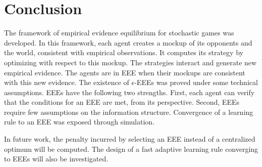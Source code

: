 \section{Conclusion}

The framework of empirical evidence equilibrium for stochastic games was developed.
In this framework, each agent creates a mockup of its opponents and the world, consistent with empirical observations.
It computes its strategy by optimizing with respect to this mockup.
The strategies interact and generate new empirical evidence.
The agents are in EEE when their mockups are consistent with this new evidence.
The existence of \(\epsilon\)-EEEs was proved under some technical assumptions.
EEEs have the following two strengths.
First, each agent can verify that the conditions for an EEE are met, from its perspective.
Second, EEEs require few assumptions on the information structure.
Convergence of a learning rule to an EEE was exposed through simulation.

In future work, the penalty incurred by selecting an EEE instead of a centralized optimum will be computed.
The design of a fast adaptive learning rule converging to EEEs will also be investigated.
